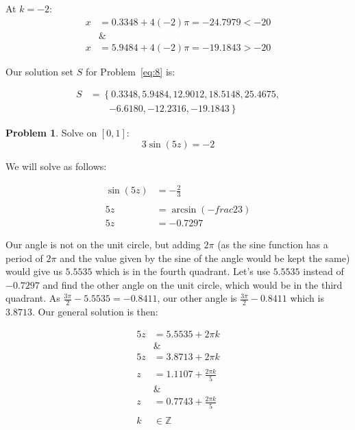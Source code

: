 \documentclass[12pt]{article}
\theoremstyle{definition}
\newtheorem{problem}{Problem}
\begin{document}
At $k=-2$:
\begin{align}
    x & = 0.3348 + 4(-2)\pi = -24.7979 < -20 \\
      & \&                                   \\
    x & = 5.9484 + 4(-2)\pi = -19.1843 > -20
\end{align}

Our solution set $S$ for Problem~\eqref{eq:8} is:

\begin{equation}
    \begin{aligned}
        S & = \left\{ 0.3348, 5.9484, 12.9012, 18.5148, 25.4675, \right. \\
          & \qquad \left. -6.6180, -12.2316, -19.1843 \right\}
    \end{aligned}
\end{equation}

\begin{problem}
Solve on $[0, 1]$:
\begin{equation*}
    3\sin(5z) = -2 \label{eq:9}
\end{equation*}
\end{problem}

We will solve as follows:

\begin{align}
    \sin(5z) & = -\frac{2}{3}                    \\
    \nonumber                                    \\
    5z       & = \arcsin\left(-frac{2}{3}\right) \\
    5z       & = -0.7297
\end{align}

Our angle is not on the unit circle, but adding $2\pi$ (as the sine function has a period of $2\pi$ and the value given by the sine of the angle would be kept the same) would give us $5.5535$ which is in the fourth quadrant.
Let's use $5.5535$ instead of $-0.7297$ and find the other angle on the unit circle, which would be in the third quadrant.
As $\frac{3\pi}{2}-5.5535=-0.8411$, our other angle is $\frac{3\pi}{2}-0.8411$ which is $3.8713$.
Our general solution is then:

\begin{align}
    5z & = 5.5535 + 2\pi k           \\
       & \&                          \\
    5z & = 3.8713 + 2\pi k           \\
    \nonumber                        \\
    z  & = 1.1107 + \frac{2\pi k}{5} \\
       & \&                          \\
    z  & = 0.7743 + \frac{2\pi k}{5} \\
    \nonumber                        \\
    k  & \in \mathbb{Z}
\end{align}
\end{document}
